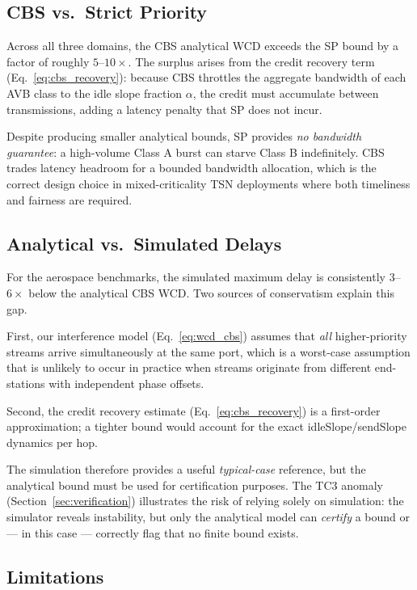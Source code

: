 \subsection{CBS vs.\ Strict Priority}

Across all three domains, the CBS analytical WCD exceeds the SP bound by a factor of roughly $5$--$10\times$. The surplus arises from the credit recovery term (Eq.~\ref{eq:cbs_recovery}): because CBS throttles the aggregate bandwidth of each AVB class to the idle slope fraction $\alpha$, the credit must accumulate between transmissions, adding a latency penalty that SP does not incur.

Despite producing smaller analytical bounds, SP provides \emph{no bandwidth guarantee}: a high-volume Class A burst can starve Class B indefinitely. CBS trades latency headroom for a bounded bandwidth allocation, which is the correct design choice in mixed-criticality TSN deployments where both timeliness and fairness are required.

\subsection{Analytical vs.\ Simulated Delays}

For the aerospace benchmarks, the simulated maximum delay is consistently $3$--$6\times$ below the analytical CBS WCD. Two sources of conservatism explain this gap.

First, our interference model (Eq.~\ref{eq:wcd_cbs}) assumes that \emph{all} higher-priority streams arrive simultaneously at the same port, which is a worst-case assumption that is unlikely to occur in practice when streams originate from different end-stations with independent phase offsets.

Second, the credit recovery estimate (Eq.~\ref{eq:cbs_recovery}) is a first-order approximation; a tighter bound would account for the exact idleSlope/sendSlope dynamics per hop.

The simulation therefore provides a useful \emph{typical-case} reference, but the analytical bound must be used for certification purposes. The TC3 anomaly (Section~\ref{sec:verification}) illustrates the risk of relying solely on simulation: the simulator reveals instability, but only the analytical model can \emph{certify} a bound or — in this case — correctly flag that no finite bound exists.

\subsection{Limitations}

